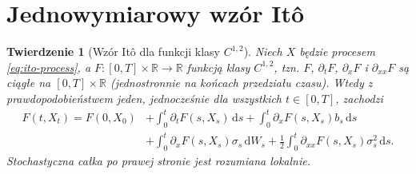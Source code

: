 \documentclass[11pt,a4paper,oneside]{report}
\numberwithin{equation}{chapter}
\theoremstyle{plain}
\newtheorem{twierdzenie}{Twierdzenie}[chapter]
\theoremstyle{definition}
\theoremstyle{remark}
\newcommand{\R}{\mathbb{R}}
\newcommand{\dd}{\mathrm{d}}
\begin{document}
\section{Jednowymiarowy wzór Itô}
\begin{twierdzenie}[Wzór Itô dla funkcji klasy $C^{1,2}$]
\label{th:ito1}
Niech $X$ będzie procesem \eqref{eq:ito-process}, a
$F:[0,T]\times\R\to\R$ funkcją klasy $C^{1,2}$,
tzn. $F$, $\partial_tF$, $\partial_xF$ i
$\partial_{xx}F$ są ciągłe na $[0,T]\times\R$
(jednostronnie na końcach przedziału czasu). Wtedy
z prawdopodobieństwem jeden, jednocześnie dla wszystkich
$t\in[0,T]$, zachodzi
\[
\begin{split}
F(t,X_t)=F(0,X_0)
&+\int_0^t\partial_tF(s,X_s)\,\dd s
+\int_0^t\partial_xF(s,X_s)b_s\,\dd s\\
&+\int_0^t\partial_xF(s,X_s)\sigma_s\,\dd W_s
+\frac12\int_0^t\partial_{xx}F(s,X_s)\sigma_s^2\,\dd s.
\end{split}
\tag{3.3}\label{eq:ito1}
\]
Stochastyczna całka po prawej stronie jest rozumiana lokalnie.
\end{twierdzenie}
\end{document}
